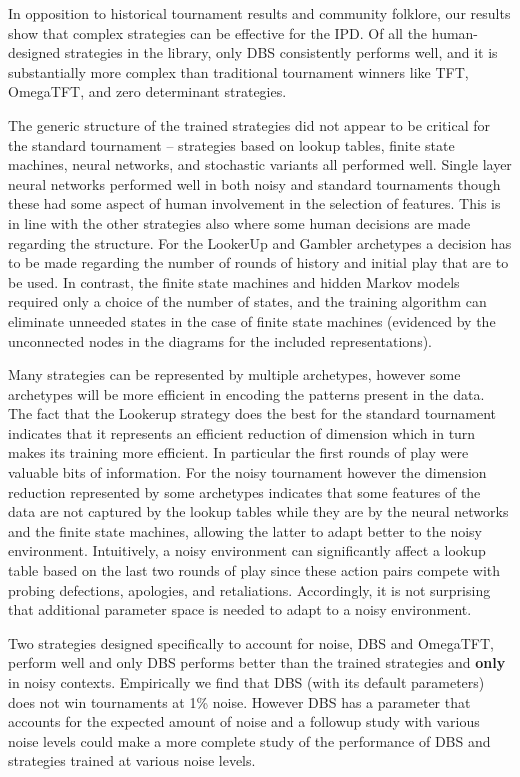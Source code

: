 \documentclass[10pt,letterpaper]{article}
\begin{document}
In opposition to historical tournament results and community folklore,
our results show that complex strategies can be effective for the
IPD\@. Of all the human-designed
strategies in the library, only DBS consistently performs well, and it is
substantially more complex than traditional tournament winners like TFT, OmegaTFT,
and zero determinant strategies.


The generic structure of the trained strategies did not appear to be
critical for the standard tournament -- strategies based on lookup tables,
finite state machines, neural networks, and stochastic variants all performed well.
Single layer neural networks performed well in both
noisy and standard tournaments
though these had some aspect of human involvement in the selection of features.
This is in line with the other strategies also where some human decisions are made
regarding the structure. For the LookerUp and Gambler archetypes
a decision has to be made
regarding the number of rounds of history and initial play that are to be used.
In contrast, the finite state machines and hidden Markov models
 required only a choice of the number
of states, and the training algorithm can eliminate unneeded states in the case
of finite state machines (evidenced by the unconnected nodes in the diagrams
for the included representations).

Many strategies can be represented by multiple archetypes, however some
archetypes will be more efficient in encoding the patterns present in the data.
The fact that the Lookerup strategy does the best for the standard
tournament indicates that it represents an efficient reduction of
dimension which in turn makes its training more efficient. In particular the
first rounds of play were valuable bits of information. For the noisy
tournament however the dimension reduction represented by some archetypes
indicates that some features of the data are not captured by the lookup
tables while they are by the neural networks and the finite state machines,
allowing the latter to adapt better to the noisy environment. Intuitively, a noisy
environment can significantly affect a lookup table based on the last two rounds
of play since these action pairs compete with probing defections, apologies, and
retaliations. Accordingly, it is not surprising that additional parameter space
is needed to adapt to a noisy environment.

Two strategies designed specifically to account for noise,
DBS and OmegaTFT, perform well and only DBS performs better than the trained
strategies and \textbf{only} in noisy contexts. Empirically we find that
DBS (with its default parameters) does not win tournaments at 1\% noise.
However DBS has a parameter that accounts for the expected amount of noise and a
followup study with various noise levels could make a more complete study of
the performance of DBS and strategies trained at various noise levels.
\end{document}
